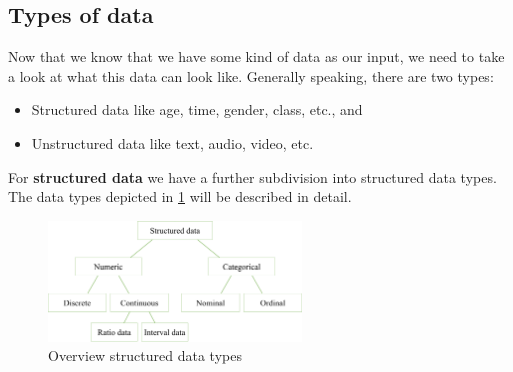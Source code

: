 \subsection{Types of data}
Now that we know that we have some kind of data as our input, we need to take a look at what this data can look like. Generally speaking, there are two types:
\begin{itemize}
  \item {}Structured data like age, time, gender, class, etc., and
  \item {}Unstructured data like text, audio, video, etc.
\end{itemize}

For \textbf{structured data} we have a further subdivision into structured data types. The data types depicted in \ref{fig:1_structured_data} will be described in detail.

\begin{figure}[H]
  \centering
  \includegraphics[width=0.6\textwidth]{assets/basics/structured_data.png}
  \caption{Overview structured data types}
  \label{fig:1_structured_data}
\end{figure}

